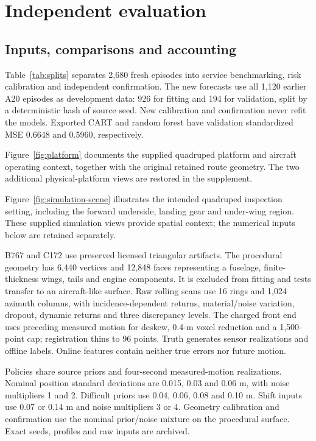 
\section{Independent evaluation}\label{sec:evaluation}
\subsection{Inputs, comparisons and accounting}
Table~\ref{tab:splits} separates 2,680 fresh episodes into service benchmarking, risk calibration and independent confirmation. The new forecasts use all 1,120 earlier A20 episodes as development data: 926 for fitting and 194 for validation, split by a deterministic hash of source seed. New calibration and confirmation never refit the models. Exported CART and random forest have validation standardized MSE 0.6648 and 0.5960, respectively.

Figure~\ref{fig:platform} documents the supplied quadruped platform and aircraft operating context, together with the original retained route geometry. The two additional physical-platform views are restored in the supplement.


Figure~\ref{fig:simulation-scene} illustrates the intended quadruped inspection setting, including the forward underside, landing gear and under-wing region. These supplied simulation views provide spatial context; the numerical inputs below are retained separately.


B767 and C172 use preserved licensed triangular artifacts. The procedural geometry has 6,440 vertices and 12,848 faces representing a fuselage, finite-thickness wings, tails and engine components. It is excluded from fitting and tests transfer to an aircraft-like surface. Raw rolling scans use 16 rings and 1,024 azimuth columns, with incidence-dependent returns, material/noise variation, dropout, dynamic returns and three discrepancy levels. The charged front end uses preceding measured motion for deskew, 0.4-m voxel reduction and a 1,500-point cap; registration thins to 96 points. Truth generates sensor realizations and offline labels. Online features contain neither true errors nor future motion.

Policies share source priors and four-second measured-motion realizations. Nominal position standard deviations are 0.015, 0.03 and 0.06 m, with noise multipliers 1 and 2. Difficult priors use 0.04, 0.06, 0.08 and 0.10 m. Shift inputs use 0.07 or 0.14 m and noise multipliers 3 or 4. Geometry calibration and confirmation use the nominal prior/noise mixture on the procedural surface. Exact seeds, profiles and raw inputs are archived.

